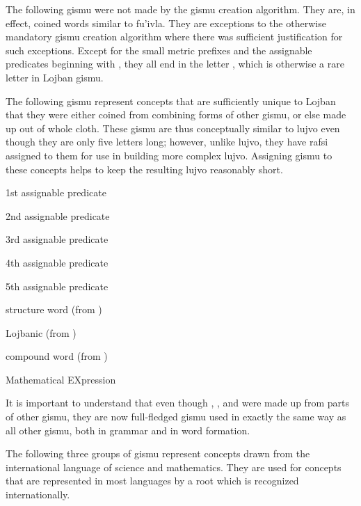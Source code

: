 The following gismu were not made by the gismu creation algorithm. They are, in effect, coined words similar to fu'ivla. They are exceptions to the otherwise mandatory gismu creation algorithm where there was sufficient justification for such exceptions. Except for the small metric prefixes and the assignable predicates beginning with , they all end in the letter , which is otherwise a rare letter in Lojban gismu.

The following gismu represent concepts that are sufficiently unique to Lojban that they were either coined from combining forms of other gismu, or else made up out of whole cloth. These gismu are thus conceptually similar to lujvo even though they are only five letters long; however, unlike lujvo, they have rafsi assigned to them for use in building more complex lujvo. Assigning gismu to these concepts helps to keep the resulting lujvo reasonably short.
\begin{description}
\item[broda]{1st assignable predicate}
\item[brode]{2nd assignable predicate}
\item[brodi]{3rd assignable predicate}
\item[brodo]{4th assignable predicate}
\item[brodu]{5th assignable predicate}
\item[cmavo]{structure word (from )}
\item[lojbo]{Lojbanic (from )}
\item[lujvo]{compound word (from )}
\item[mekso]{Mathematical EXpression}
\end{description}

It is important to understand that even though , , and  were made up from parts of other gismu, they are now full-fledged gismu used in exactly the same way as all other gismu, both in grammar and in word formation.

The following three groups of gismu represent concepts drawn from the international language of science and mathematics. They are used for concepts that are represented in most languages by a root which is recognized internationally.

